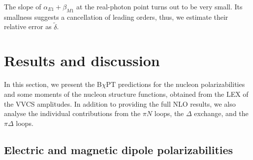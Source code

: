 \documentclass[11pt,preprint,tightenlines,
showpacs,preprintnumbers,amsmath,amssymb,superscriptaddress,a4paper,nofootinbib]{revtex4-1}
\def\al{\alpha}
\def\be{\beta}
\begin{document}
The slope of $\al_{E1}+\be_{M1}$ at the real-photon point turns out to be very small. Its smallness  suggests a cancellation of leading orders, thus, we estimate their relative error as $\tilde{\delta}$. 








\section{Results and discussion}

In this section, we present the B$\chi$PT predictions for the nucleon polarizabilities and some moments of the nucleon structure functions, obtained from the LEX of the VVCS amplitudes. In addition to providing the full NLO results, we also analyse the individual contributions from the $\pi N$ loops, the $\Delta$ exchange, and the $\pi \Delta$ loops.

\label{Sec:Scalar-Pol}

\subsection{Electric and magnetic dipole polarizabilities}
\end{document}
